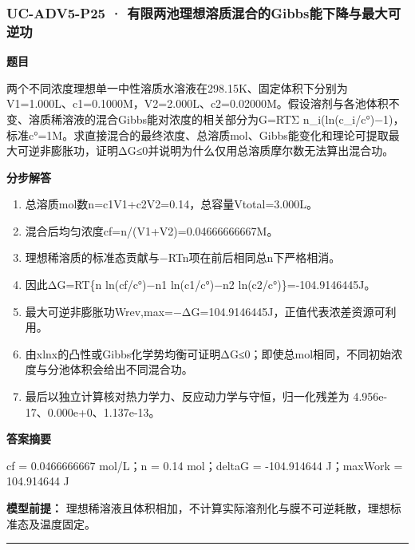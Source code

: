 \documentclass[UTF8,11pt,a4paper]{ctexart}
\begin{document}
\subsubsection*{UC-ADV5-P25 · 有限两池理想溶质混合的Gibbs能下降与最大可逆功}
\noindent\textbf{题目}\par
两个不同浓度理想单一中性溶质水溶液在298.15K、固定体积下分别为V1=1.000L、c1=0.1000M，V2=2.000L、c2=0.02000M。假设溶剂与各池体积不变、溶质稀溶液的混合Gibbs能对浓度的相关部分为G=RTΣ n\_i(ln(c\_i/c°)−1)，标准c°=1M。求直接混合的最终浓度、总溶质mol、Gibbs能变化和理论可提取最大可逆非膨胀功，证明ΔG≤0并说明为什么仅用总溶质摩尔数无法算出混合功。\par
\medskip\noindent\textbf{分步解答}
\begin{enumerate}
\item 总溶质mol数n=c1V1+c2V2=0.14，总容量Vtotal=3.000L。
\item 混合后均匀浓度cf=n/(V1+V2)=0.04666666667M。
\item 理想稀溶质的标准态贡献与−RTn项在前后相同总n下严格相消。
\item 因此ΔG=RT\{n ln(cf/c°)−n1 ln(c1/c°)−n2 ln(c2/c°)\}=-104.9146445J。
\item 最大可逆非膨胀功Wrev,max=−ΔG=104.9146445J，正值代表浓差资源可利用。
\item 由xlnx的凸性或Gibbs化学势均衡可证明ΔG≤0；即使总mol相同，不同初始浓度与分池体积会给出不同混合功。
\item 最后以独立计算核对热力学力、反应动力学与守恒，归一化残差为 4.956e-17、0.000e+0、1.137e-13。
\end{enumerate}
\noindent\textbf{答案摘要}\par
cf = 0.0466666667 mol/L；n = 0.14 mol；deltaG = -104.914644 J；maxWork = 104.914644 J\par
\noindent\textbf{模型前提：}
理想稀溶液且体积相加，不计算实际溶剂化与膜不可逆耗散，理想标准态及温度固定。\par
\medskip\hrule\medskip
{}
\end{document}
